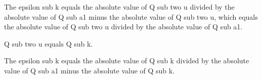 The epsilon sub k equals the absolute value of Q sub two u divided by the absolute value of Q sub a1 minus the absolute value of Q sub two u, which equals the absolute value of Q sub two u divided by the absolute value of Q sub a1.

Q sub two u equals Q sub k.

The epsilon sub k equals the absolute value of Q sub k divided by the absolute value of Q sub a1 minus the absolute value of Q sub k.